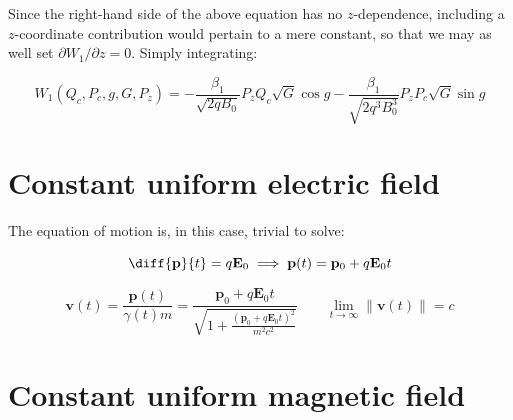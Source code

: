 Since the right-hand side of the above equation has no $z$-dependence, including a $z$-coordinate contribution would pertain to a mere constant, so that we may as well set $\partial W_1/\partial z=0$. Simply integrating:

\begin{equation}
    W_1(Q_c,P_c,g,G,P_z)=-\frac{\beta_1}{\sqrt{2qB_0}}P_zQ_c\sqrt{G}\cos{g}-\frac{\beta_1}{\sqrt{2q^3B_0^3}}P_zP_c\sqrt{G}\sin{g}
\end{equation}








































\newpage

\section{Constant uniform electric field}

The equation of motion is, in this case, trivial to solve:

\begin{equation}
    \diff{\mathbf{p}}{t}=q\mathbf{E}_0\implies\mathbf{p}(t)=\mathbf{p}_0+q\mathbf{E}_0t
\end{equation}

\begin{equation}
    \mathbf{v}(t)=\frac{\mathbf{p}(t)}{\gamma(t)m}=\frac{\mathbf{p}_0+q\mathbf{E}_0t}{\sqrt{1+\frac{(\mathbf{p}_0+q\mathbf{E}_0t)^2}{m^2c^2}}}\quad\quad\lim_{t\to\infty}\|\mathbf{v}(t)\|=c
\end{equation}

\section{Constant uniform magnetic field}

\label{sec2-2}

